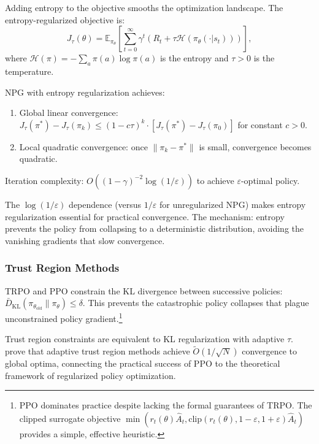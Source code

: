 Adding entropy to the objective smooths the optimization landscape. The entropy-regularized objective is:
\begin{equation}
J_\tau(\theta) = \mathbb{E}_{\pi_\theta}\left[\sum_{t=0}^\infty \gamma^t \left( R_t + \tau \mathcal{H}(\pi_\theta(\cdot|s_t)) \right)\right],
\end{equation}
where $\mathcal{H}(\pi) = -\sum_a \pi(a) \log \pi(a)$ is the entropy and $\tau > 0$ is the temperature.

\begin{theorem}
\label{thm:npg_entropy}
NPG with entropy regularization achieves:
\begin{enumerate}
\item[(a)] Global linear convergence: $J_\tau(\pi^*) - J_\tau(\pi_k) \leq (1 - c\tau)^k \cdot [J_\tau(\pi^*) - J_\tau(\pi_0)]$ for constant $c > 0$.
\item[(b)] Local quadratic convergence: once $\|\pi_k - \pi^*\|$ is small, convergence becomes quadratic.
\end{enumerate}
Iteration complexity: $O((1-\gamma)^{-2} \log(1/\varepsilon))$ to achieve $\varepsilon$-optimal policy.
\end{theorem}

The $\log(1/\varepsilon)$ dependence (versus $1/\varepsilon$ for unregularized NPG) makes entropy regularization essential for practical convergence. The mechanism: entropy prevents the policy from collapsing to a deterministic distribution, avoiding the vanishing gradients that slow convergence.


\subsubsection{Trust Region Methods}

TRPO \citep{Schulman2015} and PPO \citep{Schulman2017} constrain the KL divergence between successive policies: $\bar{D}_{\mathrm{KL}}(\pi_{\theta_{\text{old}}} \| \pi_\theta) \leq \delta$. This prevents the catastrophic policy collapses that plague unconstrained policy gradient.\footnote{PPO dominates practice despite lacking the formal guarantees of TRPO. The clipped surrogate objective $\min(r_t(\theta)\hat{A}_t, \text{clip}(r_t(\theta), 1-\varepsilon, 1+\varepsilon)\hat{A}_t)$ provides a simple, effective heuristic.}

Trust region constraints are equivalent to KL regularization with adaptive $\tau$. \citet{shani2020} prove that adaptive trust region methods achieve $\tilde{O}(1/\sqrt{N})$ convergence to global optima, connecting the practical success of PPO to the theoretical framework of regularized policy optimization.


